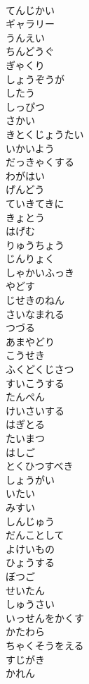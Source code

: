 \documentclass[8pt]{extreport}
\begin{document}
\begin{CJK}{UTF8}{min}
\\	てんじかい
\\	ギャラリー
\\	うんえい
\\	ちんどうぐ
\\	ぎゃくり
\\	しょうぞうが
\\	したう
\\	しっぴつ
\\	さかい
\\	きとくじょうたい
\\	いかいよう
\\	だっきゃくする
\\	わがはい
\\	げんどう
\\	ていきてきに
\\	きょとう
\\	はげむ
\\	りゅうちょう
\\	じんりょく
\\	しゃかいふっき
\\	やどす
\\	じせきのねん
\\	さいなまれる
\\	つづる
\\	あまやどり
\\	こうせき
\\	ふくどくじさつ
\\	すいこうする
\\	たんぺん
\\	けいさいする
\\	はぎとる
\\	たいまつ
\\	はしご
\\	とくひつすべき
\\	しょうがい
\\	いたい
\\	みすい
\\	しんじゅう
\\	だんことして
\\	よけいもの
\\	ひょうする
\\	ぼつご
\\	せいたん
\\	しゅうさい
\\	いっせんをかくす
\\	かたわら
\\	ちゃくそうをえる
\\	すじがき
\\	かれん

\end{CJK}
\end{document}

